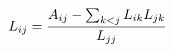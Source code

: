 \documentclass[preview]{standalone}
\begin{document}
\begin{align*}
\special{dvisvgm:raw <g id='unique000'>}L_{ij} = \frac{A_{ij} - \sum_{k<j}L_{ik}L_{jk}}{L_{jj}}\special{dvisvgm:raw </g>}
\end{align*}
\end{document}

